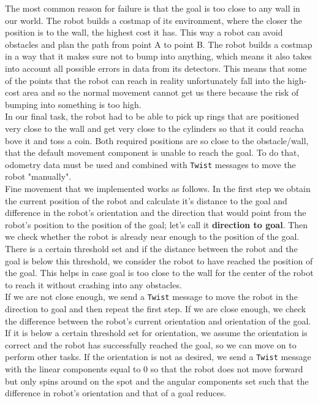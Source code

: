 \documentclass[12pt,a4paper]{article}
\begin{document}
	The most common reason for failure is that the goal is too close to any wall in our world. The robot builds a costmap of its environment, where the closer the position is to the wall, the highest cost it has. This way a robot can avoid obstacles and plan the path from point A to point B. The robot builds a costmap in a way that it makes sure not to bump into anything, which means it also takes into account all possible errors in data from its detectors. This means that some of the points that the robot can reach in reality unfortunately fall into the high-cost area and so the normal movement cannot get us there because the risk of bumping into something is too high. \\

	In our final task, the robot had to be able to pick up rings that are positioned very close to the wall and get very close to the cylinders so that it could reacha bove it and toss a coin. Both required positions are so close to the obstacle/wall, that the default movement component is unable to reach the goal. To do that, odometry data must be used and combined with \texttt{Twist} messages to move the robot "manually". \\

	Fine movement that we implemented works as follows. In the first step we obtain the current position of the robot and calculate it's distance to the goal and difference in the robot's orientation and the direction that would point from the robot's position to the position of the goal; let's call it \textbf{direction to goal}. Then we check whether the robot is already near enough to the position of the goal. There is a certain threshold set and if the distance between the robot and the goal is below this threshold, we consider the robot to have reached the position of the goal. This helps in case goal is too close to the wall for the center of the robot to reach it without crashing into any obstacles. \\
	
	If we are not close enough, we send a \texttt{Twist} message to move the robot in the direction to goal and then repeat the first step. If we are close enough, we check the difference between the robot's current orientation and orientation of the goal. If it is below a certain threshold set for orientation, we assume the orientation is correct and the robot has successfully reached the goal, so we can move on to perform other tasks. If the orientation is not as desired, we send a \texttt{Twist} message with the linear components equal to 0 so that the robot does not move forward but only spins around on the spot and the angular components set such that the difference in robot's orientation and that of a goal reduces. \\
\end{document}
